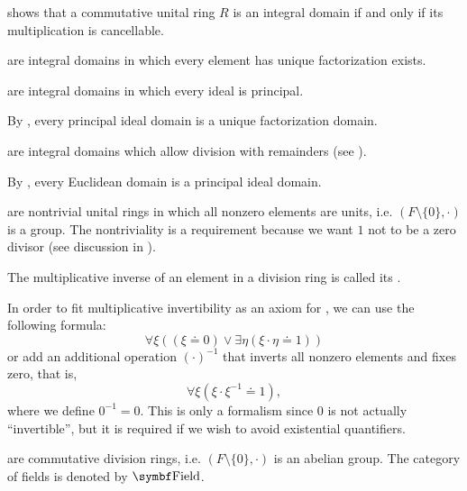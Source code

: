 \begin{definition}
\begin{defenum}
     shows that a commutative unital ring \( R \) is an integral domain if and only if its multiplication is cancellable.

      are integral domains in which every element has unique factorization exists.

      are integral domains in which every ideal is principal.

    By , every principal ideal domain is a unique factorization domain.

      are integral domains which allow division with remainders (see ).

    By , every Euclidean domain is a principal ideal domain.

      are nontrivial unital rings in which all nonzero elements are units, i.e. \( (F \setminus \{ 0 \}, \cdot) \) is a group. The nontriviality is a requirement because we want \( 1 \) not to be a zero divisor (see discussion in ).

    The multiplicative inverse of an element in a division ring is called its .

    In order to fit multiplicative invertibility as an axiom for , we can use the following formula:
    \begin{equation*}
      \forall \xi ((\xi \doteq 0) \lor \exists \eta (\xi \cdot \eta \doteq 1))
    \end{equation*}
    or add an additional operation \( (\cdot)^{-1} \) that inverts all nonzero elements and fixes zero, that is,
    \begin{equation*}
      \forall \xi (\xi \cdot \xi^{-1} \doteq 1),
    \end{equation*}
    where we define \( 0^{-1} = 0 \). This is only a formalism since \( 0 \) is not actually \enquote{invertible}, but it is required if we wish to avoid existential quantifiers.

      are commutative division rings, i.e. \( (F \setminus \{ 0 \}, \cdot) \) is an abelian group. The category of fields is denoted by \( \Cat{Field} \).
  \end{defenum}
\end{definition}

